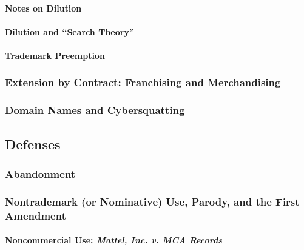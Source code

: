 \paragraph{Notes on Dilution}


\paragraph{Dilution and ``Search Theory''}


\paragraph{Trademark Preemption}


\subsubsection{Extension by Contract: Franchising and Merchandising}


\subsubsection{Domain Names and Cybersquatting}


\subsection{Defenses}

\subsubsection{Abandonment}


\subsubsection{Nontrademark (or Nominative) Use, Parody, and the First 
Amendment}

\paragraph{Noncommercial Use: \emph{Mattel, Inc. v. MCA Records}}

